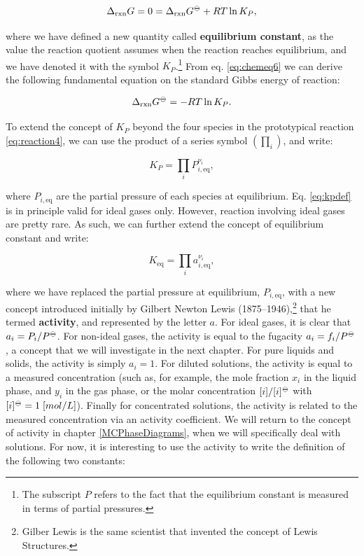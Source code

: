 \documentclass[
  9pt,
]{extbook}
\theoremstyle{definition}
\theoremstyle{definition}
\theoremstyle{definition}
\theoremstyle{definition}
\theoremstyle{remark}
\begin{document}
\begin{equation}
\Delta_{\text{rxn}} G = 0 = \Delta_{\text{rxn}} G^{-\kern-6pt{\ominus}\kern-6pt-}+ RT \ln K_P,
\label{eq:chemeq6}
\end{equation}

where we have defined a new quantity called \textbf{equilibrium constant}, as the value the reaction quotient assumes when the reaction reaches equilibrium, and we have denoted it with the symbol \(K_P\).\footnote{The subscript \(P\) refers to the fact that the equilibrium constant is measured in terms of partial pressures.} From eq. \eqref{eq:chemeq6} we can derive the following fundamental equation on the standard Gibbs energy of reaction:

\begin{equation}
\Delta_{\text{rxn}} G^{-\kern-6pt{\ominus}\kern-6pt-}= - RT \ln K_P.
\label{eq:chemeqdg0}
\end{equation}

To extend the concept of \(K_P\) beyond the four species in the prototypical reaction \eqref{eq:reaction4}, we can use the product of a series symbol \(\left( \prod_i \right)\), and write:

\begin{equation}
K_P=\prod_i P_{i,\text{eq}}^{\nu_i},
\label{eq:kpdef}
\end{equation}

where \(P_{i,\text{eq}}\) are the partial pressure of each species at equilibrium. Eq. \eqref{eq:kpdef} is in principle valid for ideal gases only. However, reaction involving ideal gases are pretty rare. As such, we can further extend the concept of equilibrium constant and write:

\begin{equation}
K_{\text{eq}} =\prod_i a_{i,\text{eq}}^{\nu_i},
\label{eq:kdef}
\end{equation}

where we have replaced the partial pressure at equilibrium, \(P_{i,\text{eq}}\), with a new concept introduced initially by Gilbert Newton Lewis (1875--1946),\footnote{Gilber Lewis is the same scientist that invented the concept of Lewis Structures.} that he termed \textbf{activity}, and represented by the letter \(a\). For ideal gases, it is clear that \(a_i=P_i/P^{-\kern-6pt{\ominus}\kern-6pt-}\). For non-ideal gases, the activity is equal to the fugacity \(a_i=f_i/P^{-\kern-6pt{\ominus}\kern-6pt-}\), a concept that we will investigate in the next chapter. For pure liquids and solids, the activity is simply \(a_i=1\). For diluted solutions, the activity is equal to a measured concentration (such as, for example, the mole fraction \(x_i\) in the liquid phase, and \(y_i\) in the gas phase, or the molar concentration \([i]/[i]^{-\kern-6pt{\ominus}\kern-6pt-}\) with \([i]^{-\kern-6pt{\ominus}\kern-6pt-}= 1\;\text[mol/L]\)). Finally for concentrated solutions, the activity is related to the measured concentration via an activity coefficient. We will return to the concept of activity in chapter \ref{MCPhaseDiagrams}, when we will specifically deal with solutions. For now, it is interesting to use the activity to write the definition of the following two constants:
\end{document}
